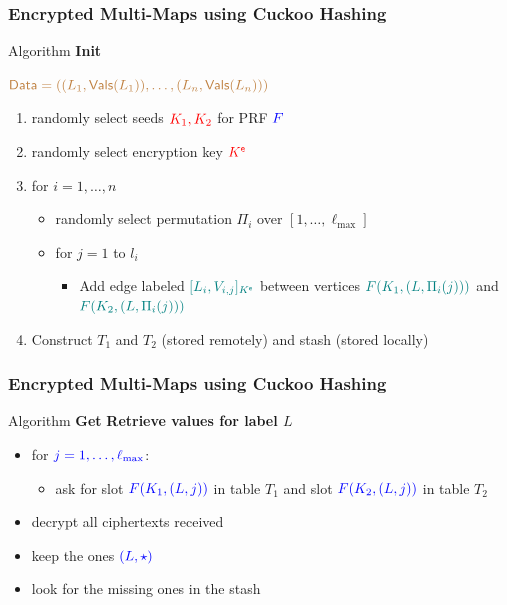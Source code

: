 \documentclass[]{beamer}
\newcommand{\db}{\mathsf{Data}}
\newcommand{\vals}{\mathsf{Vals}}
\newcommand{\ke}{K^{\mathsf{e}}}
\newcommand{\LMax}{\ell_{\text{max}}}
\begin{document}
\begin{frame}
\frametitle{Encrypted Multi-Maps using Cuckoo Hashing}

\begin{block}{Algorithm {\color{red} \bf Init}}

$\color{brown}{\db=((L_1,\vals(L_1)),\ldots,(L_n,\vals(L_n)))}$

\begin{enumerate}
    \item randomly select seeds $\color{red} K_1,K_2$ for PRF $\color{blue}F$
    \item randomly select encryption key $\color{red} \ke$
    \item for $i=1,\ldots,n$
    \begin{itemize}%
        \item randomly select permutation $\Pi_i$ over $[1,\ldots,\LMax]$
        \item for $j=1$ to $l_i$
        \begin{itemize}%
        \item Add edge labeled 
            $\color{teal}[L_i,V_{i,j}]_{\ke}$
            between vertices
           $\color{teal} F(K_1,(L,\Pi_i(j)))$ and $\color{teal} F(K_2,(L,\Pi_i(j)))$
        \end{itemize}
    \end{itemize}

    \item Construct $T_1$ and $T_2$ (stored remotely) and stash (stored locally)
\end{enumerate}
\end{block}
\end{frame}
    
\begin{frame}
\frametitle{Encrypted Multi-Maps using Cuckoo Hashing}

\begin{block}{Algorithm {\color{red} \bf Get}}
{\color{brown} \bf Retrieve values for label $L$}

    \begin{itemize}
        \item for $\color{blue} j=1,\ldots,\LMax$:
            
            \begin{itemize}
                \item ask for slot {$\color{blue} F(K_1,(L,j))$ in table $T_1$ and }
                              slot {$\color{blue} F(K_2,(L,j))$ in table $T_2$}
            \end{itemize}
             \item decrypt all ciphertexts received
             \item keep the ones $\color{blue} (L,\star)$
             \item look for the missing ones in the stash
    \end{itemize}
\end{block}
\end{frame}
\end{document}
